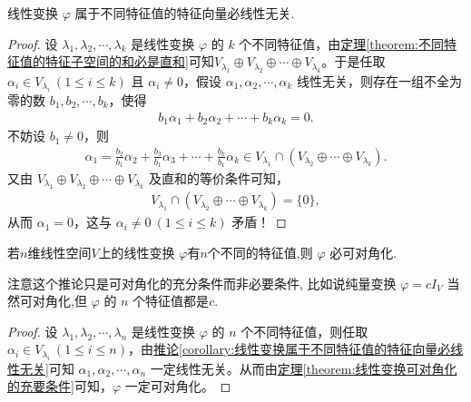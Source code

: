 \documentclass[../../main.tex]{subfiles}%
\begin{document}
\begin{corollary}\label{corollary:线性变换属于不同特征值的特征向量必线性无关}
线性变换 $\varphi$ 属于不同特征值的特征向量必线性无关.
\end{corollary}
\begin{proof}

设 $\lambda_1, \lambda_2, \cdots, \lambda_k$ 是线性变换 $\varphi$ 的 $k$ 个不同特征值，由\hyperref[theorem:不同特征值的特征子空间的和必是直和]{定理\ref{theorem:不同特征值的特征子空间的和必是直和}}可知$V_{\lambda_1} \oplus V_{\lambda_2} \oplus \cdots \oplus V_{\lambda_k}$。于是任取 $\alpha_i \in V_{\lambda_i} \ (1 \leqslant i \leqslant k)$ 且 $\alpha_i \ne 0$，假设 $\alpha_1, \alpha_2, \cdots, \alpha_k$ 线性无关，则存在一组不全为零的数 $b_1, b_2, \cdots, b_k$，使得
\begin{align*}
b_1 \alpha_1 + b_2 \alpha_2 + \cdots + b_k \alpha_k = 0.
\end{align*}
不妨设 $b_1 \ne 0$，则
\begin{align*}
\alpha_1 = \frac{b_2}{b_1} \alpha_2 + \frac{b_3}{b_1} \alpha_3 + \cdots + \frac{b_k}{b_1} \alpha_k \in V_{\lambda_1} \cap \left( V_{\lambda_2} \oplus \cdots \oplus V_{\lambda_k} \right).
\end{align*}
又由 $V_{\lambda_1} \oplus V_{\lambda_2} \oplus \cdots \oplus V_{\lambda_k}$ 及直和的等价条件可知，
\begin{align*}
V_{\lambda_1} \cap \left( V_{\lambda_2} \oplus \cdots \oplus V_{\lambda_k} \right) = \{ 0 \},
\end{align*}
从而 $\alpha_1 = 0$，这与 $\alpha_i \ne 0 \ (1 \leqslant i \leqslant k)$ 矛盾！

\end{proof}

\begin{corollary}
若$n$维线性空间$V$上的线性变换 $\varphi$有$n$个不同的特征值,则 $\varphi$ 必可对角化.
\end{corollary}
\begin{note}
注意这个推论只是可对角化的充分条件而非必要条件, 比如说纯量变换 $\varphi = cI_V$ 当然可对角化,但 $\varphi$ 的 $n$ 个特征值都是$c$.
\end{note}
\begin{proof}

设 $\lambda_1, \lambda_2, \cdots, \lambda_n$ 是线性变换 $\varphi$ 的 $n$ 个不同特征值，则任取 $\alpha_i \in V_{\lambda_i} \ (1 \leqslant i \leqslant n)$，由\hyperref[corollary:线性变换属于不同特征值的特征向量必线性无关]{推论\ref{corollary:线性变换属于不同特征值的特征向量必线性无关}}可知 $\alpha_1, \alpha_2, \cdots, \alpha_n$ 一定线性无关。从而由\hyperref[theorem:线性变换可对角化的充要条件]{定理\ref{theorem:线性变换可对角化的充要条件}}可知，$\varphi$ 一定可对角化。

\end{proof}
\end{document}
